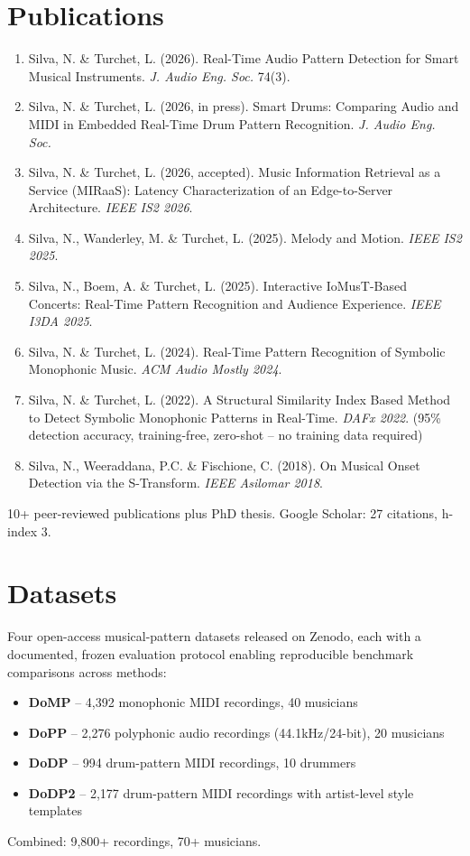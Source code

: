 \documentclass[11pt]{article}
\begin{document}
\section*{Publications}
\begin{enumerate}[leftmargin=1.5em, itemsep=-0.2em]
    \item Silva, N. \& Turchet, L. (2026). Real-Time Audio Pattern Detection for Smart Musical Instruments. \textit{J. Audio Eng. Soc.} 74(3).
    \item Silva, N. \& Turchet, L. (2026, in press). Smart Drums: Comparing Audio and MIDI in Embedded Real-Time Drum Pattern Recognition. \textit{J. Audio Eng. Soc.}
    \item Silva, N. \& Turchet, L. (2026, accepted). Music Information Retrieval as a Service (MIRaaS): Latency Characterization of an Edge-to-Server Architecture. \textit{IEEE IS2 2026}.
    \item Silva, N., Wanderley, M. \& Turchet, L. (2025). Melody and Motion. \textit{IEEE IS2 2025}.
    \item Silva, N., Boem, A. \& Turchet, L. (2025). Interactive IoMusT-Based Concerts: Real-Time Pattern Recognition and Audience Experience. \textit{IEEE I3DA 2025}.
    \item Silva, N. \& Turchet, L. (2024). Real-Time Pattern Recognition of Symbolic Monophonic Music. \textit{ACM Audio Mostly 2024}.
    \item Silva, N. \& Turchet, L. (2022). A Structural Similarity Index Based Method to Detect Symbolic Monophonic Patterns in Real-Time. \textit{DAFx 2022}. (95\% detection accuracy, training-free, zero-shot -- no training data required)
    \item Silva, N., Weeraddana, P.C. \& Fischione, C. (2018). On Musical Onset Detection via the S-Transform. \textit{IEEE Asilomar 2018}.
\end{enumerate}
10+ peer-reviewed publications plus PhD thesis. Google Scholar: 27 citations, h-index 3.

\section*{Datasets}
Four open-access musical-pattern datasets released on Zenodo, each with a documented, frozen evaluation protocol enabling reproducible benchmark comparisons across methods:
\begin{itemize}[leftmargin=1.5em, itemsep=-0.2em]
    \item \textbf{DoMP} -- 4,392 monophonic MIDI recordings, 40 musicians
    \item \textbf{DoPP} -- 2,276 polyphonic audio recordings (44.1kHz/24-bit), 20 musicians
    \item \textbf{DoDP} -- 994 drum-pattern MIDI recordings, 10 drummers
    \item \textbf{DoDP2} -- 2,177 drum-pattern MIDI recordings with artist-level style templates
\end{itemize}
Combined: 9,800+ recordings, 70+ musicians.
\end{document}
